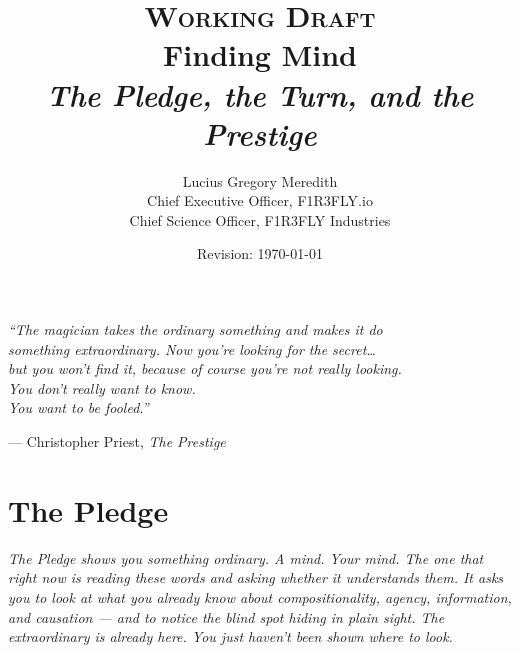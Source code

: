 \documentclass[12pt,openright,twoside]{book}
\title{%
  \vspace{-0.8in}
  {\large\scshape Working Draft}\\[0.6em]
  {\Huge\bfseries Finding Mind}\\[0.5em]
  {\large\itshape The Pledge, the Turn, and the Prestige}
}
\author{%
  Lucius Gregory Meredith\\[0.3em]
  {\small Chief Executive Officer, F1R3FLY.io}\\
  {\small Chief Science Officer, F1R3FLY Industries}
}
\date{Revision: \today}
\theoremstyle{remark}
\begin{document}

\maketitle
\thispagestyle{empty}

\newpage
\thispagestyle{empty}
\vspace*{\fill}
\begin{center}
  \large\itshape
  ``The magician takes the ordinary something and makes it do\\
  something extraordinary. Now you're looking for the secret\ldots{}\\
  but you won't find it, because of course you're not really looking.\\
  You don't really want to know.\\
  You want to be fooled.''
  \medskip

  \normalsize\upshape --- Christopher Priest, \textit{The Prestige}
\end{center}
\vspace*{\fill}
\newpage

\tableofcontents
\newpage

\part{The Pledge}

\vspace{1em}
\begin{mdframed}[backgroundcolor=remarkgray, linecolor=gray!60,
                 linewidth=1pt, topline=false, rightline=false,
                 bottomline=false]
\small\itshape
The Pledge shows you something ordinary.
A mind. Your mind.
The one that right now is reading these words and asking whether it
understands them.
It asks you to look at what you already know about compositionality,
agency, information, and causation --- and to notice the blind spot
hiding in plain sight.
The extraordinary is already here.
You just haven't been shown where to look.
\end{mdframed}
\end{document}
